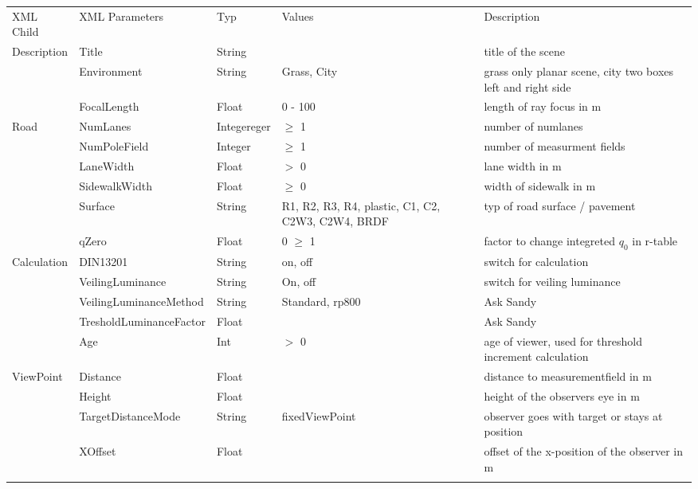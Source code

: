 \documentclass[10pt,a4paper]{report}
\newcommand{\mytoprule}{\specialrule{0.2em}{0em}{0em}}
\newcommand{\mymidrule}{\specialrule{0.1em}{0em}{0em}}
\begin{document}
\begin{landscape}
\pagestyle{empty}
\renewcommand{\arraystretch}{1.5}
	\begin{longtable}{lllp{4cm}p{6cm}}
	\mytoprule
	\rowcolor{dunkelgrau}
		XML  Child & XML Parameters & Typ & Values & Description \\
	\mymidrule
		Description & Title & String & & title of the scene \\
	 	& Environment & String & Grass, City & grass only planar scene, city two boxes left and right side \\
	 	& FocalLength & Float & 0 - 100 & length of ray focus in m \\
	\mymidrule
	\rowcolor{hellgrau}
		Road & NumLanes & Integereger & $\geq$ 1 & number of  numlanes \\\rowcolor{hellgrau}
		 & NumPoleField & Integer & $\geq$ 1 & number of measurment fields \\\rowcolor{hellgrau}
		 & LaneWidth & Float & $>$ 0 & lane width in m \\\rowcolor{hellgrau}
		 & SidewalkWidth & Float & $\geq$ 0 & width of sidewalk in m \\\rowcolor{hellgrau}
		 & Surface & String & R1, R2, R3, R4, plastic, C1, C2, C2W3, C2W4, BRDF & typ of road surface / pavement \\\rowcolor{hellgrau}
	 & qZero & Float & 0 $\geq$ 1 & factor to change integreted $q_0$ in r-table \\
	\mymidrule
		Calculation & DIN13201 & String & on, off & switch for calculation  \\
		 & VeilingLuminance & String & On, off & switch for veiling luminance \\
		 & VeilingLuminanceMethod & String & Standard, rp800 & Ask Sandy \\
		 & TresholdLuminanceFactor & Float & & Ask Sandy \\
		 & Age & Int & $>$ 0 & age of viewer, used for threshold increment calculation \\
	\mymidrule
	\rowcolor{hellgrau}
		ViewPoint & Distance & Float & & distance to measurementfield in m \\\rowcolor{hellgrau}
		 & Height & Float & & height of the observers eye in m \\\rowcolor{hellgrau}
		 & TargetDistanceMode & String & fixedViewPoint & observer goes with target or stays at position \\\rowcolor{hellgrau}
		 & XOffset & Float & & offset of the x-position of the observer in m \\\rowcolor{hellgrau}

\end{longtable}
\end{landscape}
\end{document}
